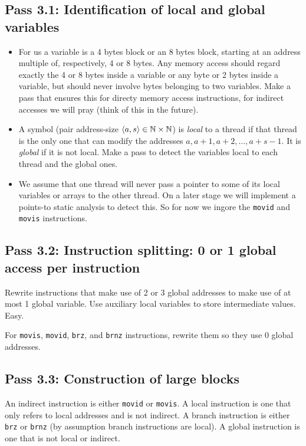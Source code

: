 \documentclass{llncs}
\begin{document}
\subsection*{Pass 3.1: Identification of local and global variables}
\begin{itemize}
\item
  For us a variable is a 4 bytes block or an 8 bytes block, starting at an
  address multiple of, respectively, 4 or 8 bytes. Any memory access should
  regard exactly the 4 or 8 bytes inside a variable or any byte or 2 bytes inside a
  variable, but should never involve bytes belonging to two variables.
  Make a pass that ensures this for directy memory access instructions, for
  indirect accesses we will pray (think of this in the future).
\item
  A symbol (pair address-size $\langle a,s\rangle \in \mathbb{N} \times \mathbb{N}$) is \emph{local} to a
  thread if that thread is the only one that can modify the addresses
  $a, a+1, a+2, \ldots, a+s-1$.
  It is \emph{global} if it is not local.
  Make a pass to detect the variables local to each thread and the global ones.
\item
  We assume that one thread will never pass a pointer to some of its local
  variables or arrays to the other thread. On a later stage we will implement a
  points-to static analysis to detect this.
  So for now we ingore the \verb!movid! and \verb!movis! instructions.
\end{itemize}

\subsection*{Pass 3.2: Instruction splitting: 0 or 1 global access per instruction}

Rewrite instructions that make use of 2 or 3 global addresses to make use of at
most 1 global variable.
Use auxiliary local variables to store intermediate values. Easy.

For \verb!movis!, \verb!movid!, \verb!brz!, and \verb!brnz! instructions,
rewrite them so they use 0 global addresses.

\subsection*{Pass 3.3: Construction of large blocks}

An indirect instruction is either \verb!movid! or \verb!movis!.
A local instruction is one that only refers to local addresses and is not
indirect.
A branch instruction is either
\verb!brz! or \verb!brnz! (by assumption branch instructions are local).
A global instruction is one that is not local or indirect.
\end{document}
